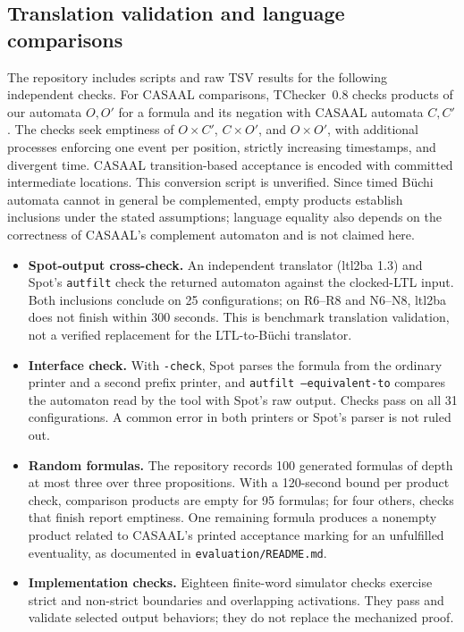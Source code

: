 \subsection{Translation validation and language comparisons}
\label{sec:validation}
The repository includes scripts and raw TSV results for the following
independent checks. For CASAAL comparisons, TChecker~0.8 checks products of
our automata $O,O'$ for a formula and its negation with CASAAL automata
$C,C'$. The checks seek emptiness of $O\times C'$, $C\times O'$, and
$O\times O'$, with additional processes enforcing one event per position,
strictly increasing timestamps, and divergent time. CASAAL transition-based
acceptance is encoded with committed intermediate locations. This conversion
script is unverified. Since timed B\"uchi automata cannot in general be
complemented, empty products establish inclusions under the stated
assumptions; language equality also depends on the correctness of CASAAL's
complement automaton and is not claimed here.
\begin{itemize}[leftmargin=*]
\item \textbf{Spot-output cross-check.} An independent translator (ltl2ba 1.3) and Spot's \texttt{autfilt} check the returned automaton against the clocked-LTL input. Both inclusions conclude on 25 configurations; on R6--R8 and N6--N8, ltl2ba does not finish within 300 seconds. This is benchmark translation validation, not a verified replacement for the LTL-to-B\"uchi translator.
\item \textbf{Interface check.} With \texttt{-check}, Spot parses the formula from the ordinary printer and a second prefix printer, and \texttt{autfilt --equivalent-to} compares the automaton read by the tool with Spot's raw output. Checks pass on all 31 configurations. A common error in both printers or Spot's parser is not ruled out.
\item \textbf{Random formulas.} The repository records 100 generated formulas of depth at most three over three propositions. With a 120-second bound per product check, comparison products are empty for 95 formulas; for four others, checks that finish report emptiness. One remaining formula produces a nonempty product related to CASAAL's printed acceptance marking for an unfulfilled eventuality, as documented in \texttt{evaluation/README.md}.
\item \textbf{Implementation checks.} Eighteen finite-word simulator checks exercise strict and non-strict boundaries and overlapping activations. They pass and validate selected output behaviors; they do not replace the mechanized proof.
\end{itemize}
